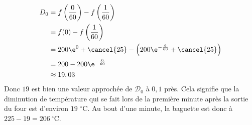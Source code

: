 \begin{enumerate}
\begin{enumerate}
\begin{align*}
{D}_0 &= f\left(\dfrac{0}{60}\right)- f\left(\dfrac{1}{60}\right) \\
&= f(0) - f\left(\dfrac{1}{60}\right) \\
&= 200\e^0 + \cancel{25} - \left(200\e^{-\frac{6}{60}} + \cancel{25}\right) \\
&= 200 - 200\e^{-\frac{6}{60}} \\
&\approx 19,03
\end{align*}
Donc $19$ est bien une valeur approchée de $\mathcal{D}_0$ à $0,1$ près. Cela signifie que la diminution de température qui se fait lors de la première minute après la sortie du four est d'environ $19$ $^{\circ}$C. Au bout d'une minute, la baguette est donc à $225-19 = 206 \ ^{\circ}$C.
		




\end{enumerate}
\end{enumerate}
